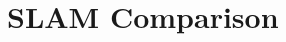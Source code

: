 \documentclass[12pt, a4paper, onecolumn]{article}
\begin{document}
%
%
%

\section{SLAM Comparison}
\end{document}
